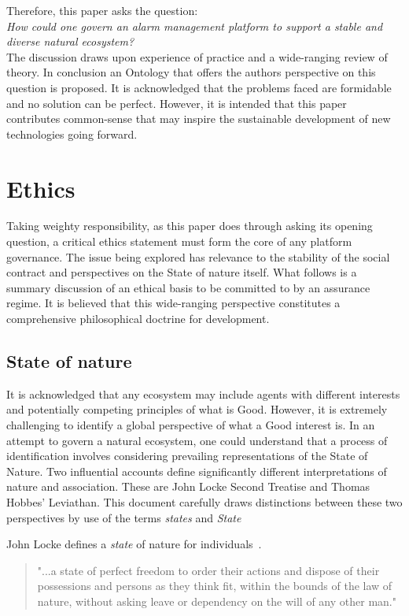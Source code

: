 \documentclass[11pt, oneside]{book}   	%
\begin{document}
Therefore, this paper asks the question:\\

\emph{How could one govern an alarm management platform to support a stable and diverse natural ecosystem?}\\

The discussion draws upon experience of practice and a wide-ranging review of theory.
In conclusion an Ontology that offers the authors perspective on this question is proposed.
It is acknowledged that the problems faced are formidable and no solution can be perfect.
However, it is intended that this paper contributes common-sense that may inspire the sustainable development of new technologies going forward.\

\pagebreak

\chapter{Ethics}
Taking weighty responsibility, as this paper does through asking its opening question, a critical ethics statement must form the core of any platform governance.
The issue being explored has relevance to the stability of the social contract and perspectives on the State of nature itself.
What follows is a summary discussion of an ethical basis to be committed to by an assurance regime.
It is believed that this wide-ranging perspective constitutes a comprehensive philosophical doctrine for development.

\section{State of nature}
It is acknowledged that any ecosystem may include agents with different interests and potentially competing principles of what is Good.
However, it is extremely challenging to identify a global perspective of what a Good interest is.
In an attempt to govern a natural ecosystem, one could understand that a process of identification involves considering prevailing representations of the State of Nature.
Two influential accounts define significantly different interpretations of nature and association.
These are John Locke Second Treatise and Thomas Hobbes' Leviathan.
This document carefully draws distinctions between these two perspectives by use of the terms \emph{states} and \emph{State}\

John Locke defines a \emph{state} of nature for individuals~\cite{jl1}.

\begin{quote}
"...a state of perfect freedom to order their actions and dispose of their possessions and persons as they think fit, within the bounds of the law of nature, without asking leave or dependency on the will of any other man."
\end{quote}
\end{document}
